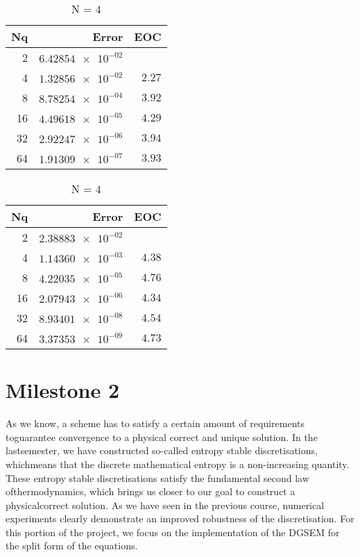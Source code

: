 \documentclass[11pt]{scrartcl}
\begin{document}
\begin{table}[H]
\parbox{.45\linewidth}{
\centering
    \begin{tabular}{|r|r|r|}
    \hline\hline
    \textbf{Nq} & \textbf{Error} & \textbf{EOC} \\\hline
    2 & $\num{6.42854e-02}$ &  \\
    4 & $\num{1.32856e-02}$ & $\num{2.27}$ \\
    8 & $\num{8.78254e-04}$ & $\num{3.92}$ \\
    16 & $\num{4.49618e-05}$ & $\num{4.29}$ \\
    32 & $\num{2.92247e-06}$ & $\num{3.94}$ \\
    64 & $\num{1.91309e-07}$ & $\num{3.93}$ \\\hline\hline
  \end{tabular} 
  \caption{N = $3$}
  }
  \parbox{.45\linewidth}{
	\centering
    \begin{tabular}{|r|r|r|}
    \hline\hline
    \textbf{Nq} & \textbf{Error} & \textbf{EOC} \\\hline
    2 & $\num{2.38883e-02}$ &  \\
    4 & $\num{1.14360e-03}$ & $\num{4.38}$ \\
    8 & $\num{4.22035e-05}$ & $\num{4.76}$ \\
    16 & $\num{2.07943e-06}$ & $\num{4.34}$ \\
    32 & $\num{8.93401e-08}$ & $\num{4.54}$ \\
    64 & $\num{3.37353e-09}$ & $\num{4.73}$ \\\hline\hline
  \end{tabular}
   \caption{N = $4$}
  }
\end{table}

\newpage
\section{Milestone 2}
As we know, a scheme has to satisfy a certain amount of requirements toguarantee convergence to a physical correct and unique solution. In the lastsemester, we have constructed so-called entropy stable discretisations, whichmeans that the discrete mathematical entropy is a non-increasing quantity. These entropy stable discretisations satisfy the fundamental second law ofthermodynamics, which brings us closer to our goal to construct a physicalcorrect solution. As we have seen in the previous course, numerical experiments clearly demonstrate an improved robustness of the discretisation. For this portion of the project, we focus on the implementation of the DGSEM for the split form of the equations. \\
\end{document}
